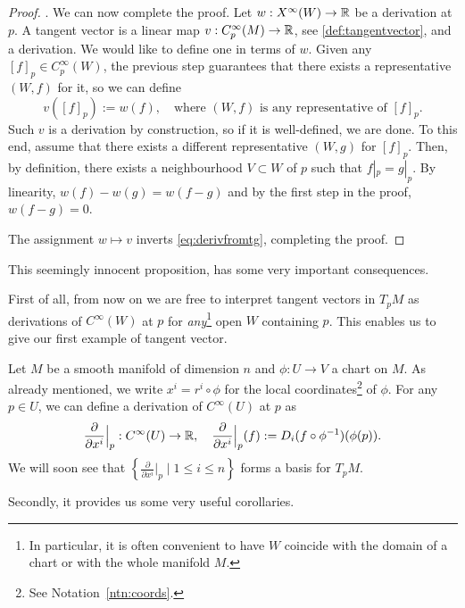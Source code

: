 \begin{proof}
  . We can now complete the proof.
  Let $w:X^\infty(W) \to\mathbb{R}$ be a derivation at $p$.
  A tangent vector is a linear map $v:C_p^\infty(M)\to\mathbb{R}$, see \eqref{def:tangentvector}, and a derivation.
  We would like to define one in terms of $w$.
  Given any $[f]_p\in C_p^\infty(W)$, the previous step guarantees that there exists a representative $(W,f)$ for it, so we can define
  \begin{equation}
    v([f]_p) := w(f), \quad\mbox{where $(W,f)$ is any representative of $[f]_p$}.
  \end{equation}
  Such $v$ is a derivation by construction, so if it is well-defined, we are done.
  To this end, assume that there exists a different representative $(W, g)$ for $[f]_p$.
  Then, by definition, there exists a neighbourhood $V\subset W$ of $p$ such that $f|_p = g|_p$.
  By linearity, $w(f) - w(g) = w(f-g)$ and by the first step in the proof, $w(f-g) = 0$.
  
  The assignment $w\mapsto v$ inverts \eqref{eq:derivfromtg}, completing the proof.
\end{proof}

This seemingly innocent proposition, has some very important consequences.

First of all, from now on we are free to interpret tangent vectors in $T_p M$ as derivations of $C^\infty(W)$ at $p$ for \emph{any}\footnote{In particular, it is often convenient to have $W$ coincide with the domain of a chart or with the whole manifold $M$.} open $W$ containing $p$.
This enables us to give our first example of tangent vector.

\begin{example}\label{ex:partialderivative}
  Let $M$ be a smooth manifold of dimension $n$ and $\phi: U \to V$ a chart on $M$.
  As already mentioned, we write $x^i = r^i \circ \phi$ for the local coordinates\footnote{See Notation~\ref{ntn:coords}.} of $\phi$.
  For any $p\in U$, we can define a derivation of $C^\infty(U)$ at $p$ as
  \begin{equation}
    \frac{\partial}{\partial x^i}\Big|_p : C^\infty(U) \to \mathbb{R}, \quad
    \frac{\partial}{\partial x^i}\Big|_p (f) := D_i(f\circ\phi^{-1})(\phi(p)).
  \end{equation}
  We will soon see that $\left\{\frac{\partial}{\partial x^i}\Big|_p \mid 1\leq i\leq n\right\}$ forms a basis for $T_p M$.
\end{example}

Secondly, it provides us some very useful corollaries.

